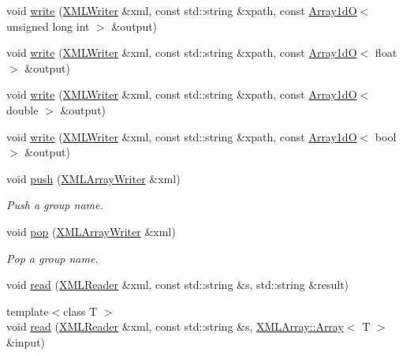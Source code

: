 \begin{DoxyCompactItemize}
void \mbox{\hyperlink{group__io_ga930bf7dd8f7a313ec5f29eacc08d06ba}{write}} (\mbox{\hyperlink{classADATXML_1_1XMLWriter}{X\+M\+L\+Writer}} \&xml, const std\+::string \&xpath, const \mbox{\hyperlink{classADAT_1_1Array1dO}{Array1dO}}$<$ unsigned long int $>$ \&output)
\item 
void \mbox{\hyperlink{group__io_ga83e5a11ea845805029325ff1c7946f36}{write}} (\mbox{\hyperlink{classADATXML_1_1XMLWriter}{X\+M\+L\+Writer}} \&xml, const std\+::string \&xpath, const \mbox{\hyperlink{classADAT_1_1Array1dO}{Array1dO}}$<$ float $>$ \&output)
\item 
void \mbox{\hyperlink{group__io_ga60a959cadded600c1c4768075005f76e}{write}} (\mbox{\hyperlink{classADATXML_1_1XMLWriter}{X\+M\+L\+Writer}} \&xml, const std\+::string \&xpath, const \mbox{\hyperlink{classADAT_1_1Array1dO}{Array1dO}}$<$ double $>$ \&output)
\item 
void \mbox{\hyperlink{group__io_ga17afd14eb981c71780dc1b0074758afc}{write}} (\mbox{\hyperlink{classADATXML_1_1XMLWriter}{X\+M\+L\+Writer}} \&xml, const std\+::string \&xpath, const \mbox{\hyperlink{classADAT_1_1Array1dO}{Array1dO}}$<$ bool $>$ \&output)
\item 
void \mbox{\hyperlink{group__io_ga957f4130fa008139cd16879b0794ae54}{push}} (\mbox{\hyperlink{classADATXML_1_1XMLArrayWriter}{X\+M\+L\+Array\+Writer}} \&xml)
\begin{DoxyCompactList}\small\item\em Push a group name. \end{DoxyCompactList}\item 
void \mbox{\hyperlink{group__io_gafc9d3fe6a9094c09371a9213eb4b6cdd}{pop}} (\mbox{\hyperlink{classADATXML_1_1XMLArrayWriter}{X\+M\+L\+Array\+Writer}} \&xml)
\begin{DoxyCompactList}\small\item\em Pop a group name. \end{DoxyCompactList}\item 
void \mbox{\hyperlink{group__io_ga9ad99522897be390bf165bf7f963acc8}{read}} (\mbox{\hyperlink{classADATXML_1_1XMLReader}{X\+M\+L\+Reader}} \&xml, const std\+::string \&s, std\+::string \&result)
\item 
{\footnotesize template$<$class T $>$ }\\void \mbox{\hyperlink{group__io_gae46a9532d6b16b2a3dc58d889eb1d688}{read}} (\mbox{\hyperlink{classADATXML_1_1XMLReader}{X\+M\+L\+Reader}} \&xml, const std\+::string \&s, \mbox{\hyperlink{classXMLArray_1_1Array}{X\+M\+L\+Array\+::\+Array}}$<$ T $>$ \&input)

\end{DoxyCompactItemize}

